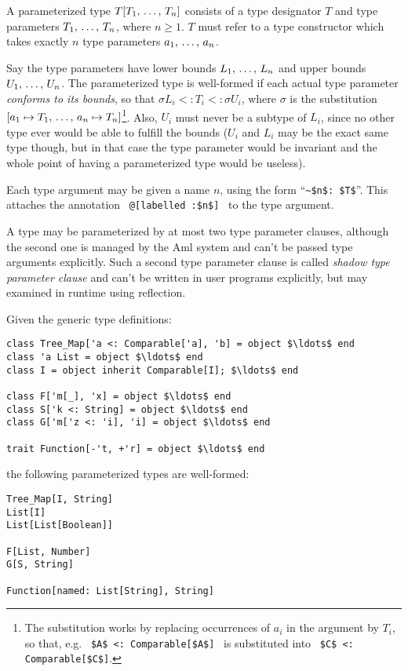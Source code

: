 A parameterized type $T[T_1 ,\, \ldots ,\, T_n]$ consists of a type designator $T$ and type parameters $T_1 ,\, \ldots ,\, T_n$, where $n \geq 1$. $T$ must refer to a type constructor which takes exactly $n$ type parameters $a_1 ,\, \ldots ,\, a_n$. 

Say the type parameters have lower bounds $L_1 ,\, \ldots ,\, L_n$ and upper bounds $U_1 ,\, \ldots ,\, U_n$. The parameterized type is well-formed if each actual type parameter {\em conforms to its bounds}, so that $\sigma L_i <: T_i <: \sigma U_i$, where $\sigma$ is the substitution $[a_1 \mapsto T_1 ,\, \ldots ,\, a_n \mapsto T_n]$\footnote{The substitution works by replacing occurrences of $a_i$ in the argument by $T_i$, so that, e.g. ~\lstinline!$A$ <: Comparable[$A$]!~ is substituted into ~\lstinline!$C$ <: Comparable[$C$]!.}. Also, $U_i$ must never be a subtype of $L_i$, since no other type ever would be able to fulfill the bounds ($U_i$ and $L_i$ may be the exact same type though, but in that case the type parameter would be invariant and the whole point of having a parameterized type would be useless). 

Each type argument may be given a name $n$, using the form ``\lstinline!~$n$: $T$!''. This attaches the annotation ~\lstinline!@[labelled :$n$]!~ to the type argument. 

A type may be parameterized by at most two type parameter clauses, although the second one is managed by the Aml system and can't be passed type arguments explicitly. Such a second type parameter clause is called {\em shadow type parameter clause} and can't be written in user programs explicitly, but may examined in runtime using reflection. 

\example
\label{example:parameterized-types}
Given the generic type definitions: 

\begin{lstlisting}
class Tree_Map['a <: Comparable['a], 'b] = object $\ldots$ end
class 'a List = object $\ldots$ end
class I = object inherit Comparable[I]; $\ldots$ end

class F['m[_], 'x] = object $\ldots$ end
class S['k <: String] = object $\ldots$ end
class G['m['z <: 'i], 'i] = object $\ldots$ end

trait Function[-'t, +'r] = object $\ldots$ end
\end{lstlisting}

the following parameterized types are well-formed: 

\begin{lstlisting}
Tree_Map[I, String]
List[I]
List[List[Boolean]]

F[List, Number]
G[S, String]

Function[named: List[String], String]
\end{lstlisting}

